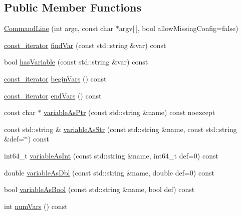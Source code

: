 \subsection*{Public Member Functions}
\begin{DoxyCompactItemize}
\item 
\hyperlink{classtheoria_1_1util_1_1CommandLine_a7e753aa91c5a0018a1bec3439839852d}{Command\+Line} (int argc, const char $\ast$argv\mbox{[}$\,$\mbox{]}, bool allow\+Missing\+Config=false)
\item 
\hyperlink{classtheoria_1_1util_1_1CommandLine_a729aa00feedd8257d4caafc73ac6ee63}{const\+\_\+iterator} \hyperlink{classtheoria_1_1util_1_1CommandLine_adedd9cbacd108ee1b5454570a200f497}{find\+Var} (const std\+::string \&var) const
\item 
bool \hyperlink{classtheoria_1_1util_1_1CommandLine_adb659582b2ce6b2ef9666562ac05bd5f}{has\+Variable} (const std\+::string \&var) const
\item 
\hyperlink{classtheoria_1_1util_1_1CommandLine_a729aa00feedd8257d4caafc73ac6ee63}{const\+\_\+iterator} \hyperlink{classtheoria_1_1util_1_1CommandLine_a65446583fe4fe7d3a9ae1ed4dd23185e}{begin\+Vars} () const
\item 
\hyperlink{classtheoria_1_1util_1_1CommandLine_a729aa00feedd8257d4caafc73ac6ee63}{const\+\_\+iterator} \hyperlink{classtheoria_1_1util_1_1CommandLine_add5993c46a68548f70a75b2eb9431558}{end\+Vars} () const
\item 
const char $\ast$ \hyperlink{classtheoria_1_1util_1_1CommandLine_a26dab1188ed94478a4eaaf1b9e1ed19e}{variable\+As\+Ptr} (const std\+::string \&name) const noexcept
\item 
const std\+::string \& \hyperlink{classtheoria_1_1util_1_1CommandLine_aa9310fbfe3b1397bb9288eee7aae4abc}{variable\+As\+Str} (const std\+::string \&name, const std\+::string \&def=\char`\"{}\char`\"{}) const
\item 
int64\+\_\+t \hyperlink{classtheoria_1_1util_1_1CommandLine_a182748d9cfb606cbf45ee7dc7e016a52}{variable\+As\+Int} (const std\+::string \&name, int64\+\_\+t def=0) const
\item 
double \hyperlink{classtheoria_1_1util_1_1CommandLine_a42fbe66f3bcf121ad631df39d09606ef}{variable\+As\+Dbl} (const std\+::string \&name, double def=0) const
\item 
bool \hyperlink{classtheoria_1_1util_1_1CommandLine_a6d4d9be7adcf9ac15a1e5469535e97e9}{variable\+As\+Bool} (const std\+::string \&name, bool def) const
\item 
int \hyperlink{classtheoria_1_1util_1_1CommandLine_abe3bbdaa5b4abb7bf86996304b451253}{num\+Vars} () const

\end{DoxyCompactItemize}
